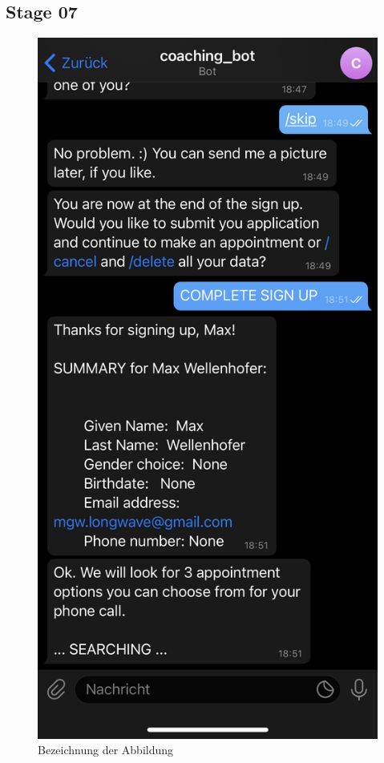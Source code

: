 \subsection{Stage 07}
\begin{figure} %
	\centering
	\includegraphics{images/coaching_bot_dummy_screenshot.jpeg}
	\caption{Bezeichnung der Abbildung}
	\label{a8}
\end{figure}


